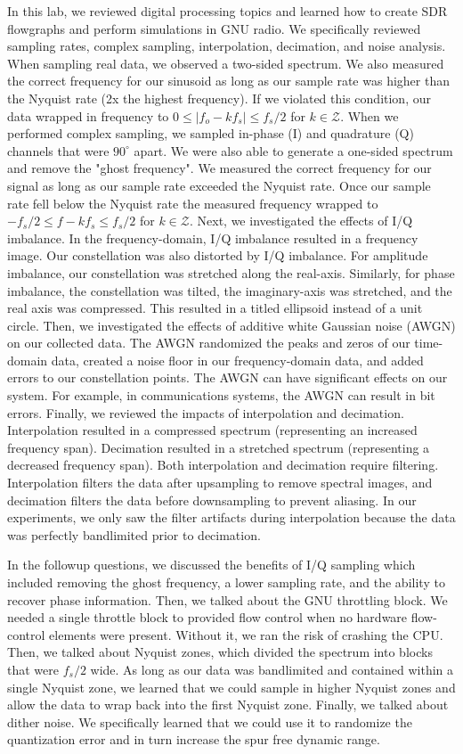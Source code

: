 \documentclass{article}
\begin{document}
In this lab, we reviewed digital processing topics and learned how to create SDR flowgraphs and perform simulations in GNU radio. We specifically reviewed sampling rates, complex sampling, interpolation, decimation, and noise analysis. When sampling real data, we observed a two-sided spectrum. We also measured the correct frequency for our sinusoid as long as our sample rate was higher than the Nyquist rate (2x the highest frequency). If we violated this condition, our data wrapped in frequency to $0 \leq |f_o - kf_s| \leq f_s/2$ for $k \in \mathcal{Z}$. When we performed complex sampling, we sampled in-phase (I) and quadrature (Q) channels that were $90^\circ$ apart. We were also able to generate a one-sided spectrum and remove the "ghost frequency". We measured the correct frequency for our signal as long as our sample rate exceeded the Nyquist rate. Once our sample rate fell below the Nyquist rate the measured frequency wrapped to $-f_s/2 \leq f - kf_s \leq f_s/2$ for $k \in \mathcal{Z}$. Next, we investigated the effects of I/Q imbalance. In the frequency-domain, I/Q imbalance resulted in a frequency image. Our constellation was also distorted by I/Q imbalance. For amplitude imbalance, our constellation was stretched along the real-axis. Similarly, for phase imbalance, the constellation was tilted, the imaginary-axis was stretched, and the real axis was compressed. This resulted in a titled ellipsoid instead of a unit circle. Then, we investigated the effects of additive white Gaussian noise (AWGN) on our collected data. The AWGN randomized the peaks and zeros of our time-domain data, created a noise floor in our frequency-domain data, and added errors to our constellation points. The AWGN can have significant effects on our system. For example, in communications systems, the AWGN can result in bit errors. Finally, we reviewed the impacts of interpolation and decimation. Interpolation resulted in a compressed spectrum (representing an increased frequency span). Decimation resulted in a stretched spectrum (representing a decreased frequency span). Both interpolation and decimation require filtering. Interpolation filters the data after upsampling to remove spectral images, and decimation filters the data before downsampling to prevent aliasing. In our experiments, we only saw the filter artifacts during interpolation because the data was perfectly bandlimited prior to decimation.

In the followup questions, we discussed the benefits of I/Q sampling which included removing the ghost frequency, a lower sampling rate, and the ability to recover phase information. Then, we talked about the GNU throttling block. We needed a single throttle block to provided flow control when no hardware flow-control elements were present. Without it, we ran the risk of crashing the CPU. Then, we talked about Nyquist zones, which divided the spectrum into blocks that were $f_s/2$ wide. As long as our data was bandlimited and contained within a single Nyquist zone, we learned that we could sample in higher Nyquist zones and allow the data to wrap back into the first Nyquist zone. Finally, we talked about dither noise. We specifically learned that we could use it to randomize the quantization error and in turn increase the spur free dynamic range.
\end{document}
